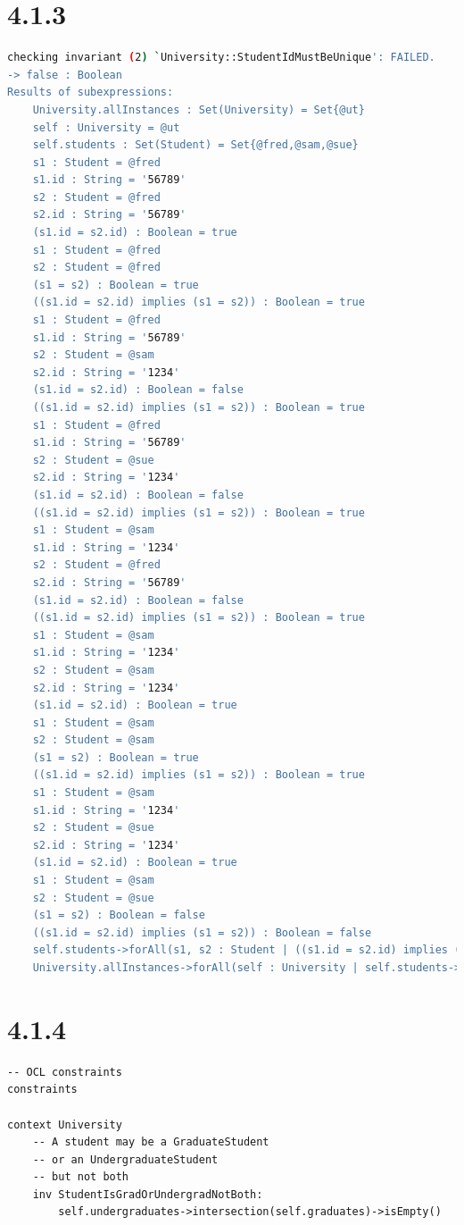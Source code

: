 \documentclass{article}
\begin{document}
	\section*{4.1.3}
\begin{lstlisting}[language=bash]
checking invariant (2) `University::StudentIdMustBeUnique': FAILED.
-> false : Boolean
Results of subexpressions:
	University.allInstances : Set(University) = Set{@ut}
	self : University = @ut
	self.students : Set(Student) = Set{@fred,@sam,@sue}
	s1 : Student = @fred
	s1.id : String = '56789'
	s2 : Student = @fred
	s2.id : String = '56789'
	(s1.id = s2.id) : Boolean = true
	s1 : Student = @fred
	s2 : Student = @fred
	(s1 = s2) : Boolean = true
	((s1.id = s2.id) implies (s1 = s2)) : Boolean = true
	s1 : Student = @fred
	s1.id : String = '56789'
	s2 : Student = @sam
	s2.id : String = '1234'
	(s1.id = s2.id) : Boolean = false
	((s1.id = s2.id) implies (s1 = s2)) : Boolean = true
	s1 : Student = @fred
	s1.id : String = '56789'
	s2 : Student = @sue
	s2.id : String = '1234'
	(s1.id = s2.id) : Boolean = false
	((s1.id = s2.id) implies (s1 = s2)) : Boolean = true
	s1 : Student = @sam
	s1.id : String = '1234'
	s2 : Student = @fred
	s2.id : String = '56789'
	(s1.id = s2.id) : Boolean = false
	((s1.id = s2.id) implies (s1 = s2)) : Boolean = true
	s1 : Student = @sam
	s1.id : String = '1234'
	s2 : Student = @sam
	s2.id : String = '1234'
	(s1.id = s2.id) : Boolean = true
	s1 : Student = @sam
	s2 : Student = @sam
	(s1 = s2) : Boolean = true
	((s1.id = s2.id) implies (s1 = s2)) : Boolean = true
	s1 : Student = @sam
	s1.id : String = '1234'
	s2 : Student = @sue
	s2.id : String = '1234'
	(s1.id = s2.id) : Boolean = true
	s1 : Student = @sam
	s2 : Student = @sue
	(s1 = s2) : Boolean = false
	((s1.id = s2.id) implies (s1 = s2)) : Boolean = false
	self.students->forAll(s1, s2 : Student | ((s1.id = s2.id) implies (s1 = s2))) : Boolean = false
	University.allInstances->forAll(self : University | self.students->forAll(s1, s2 : Student | ((s1.id = s2.id) implies (s1 = s2)))) : Boolean = false
\end{lstlisting}
\section*{4.1.4}
\begin{lstlisting}
-- OCL constraints
constraints

context University
	-- A student may be a GraduateStudent
	-- or an UndergraduateStudent
	-- but not both
	inv StudentIsGradOrUndergradNotBoth:
		self.undergraduates->intersection(self.graduates)->isEmpty()
\end{lstlisting}
\end{document}
